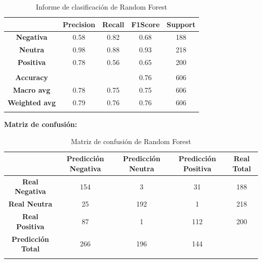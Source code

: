 \documentclass{report}
\begin{document}
{\begin{center}
{                    \begin{longtable}{|c|c|c|c|c|}
                    \hline
                    & \textbf{Precision} & \textbf{Recall} & \textbf{F1Score} & \textbf{Support} \\
                    \hline
                    \textbf{Negativa} & 0.58 & 0.82 & 0.68 & 188 \\
                    \hline
                    \textbf{Neutra} & 0.98 & 0.88 & 0.93 & 218 \\
                    \hline
                    \textbf{Positiva} & 0.78 & 0.56 & 0.65 & 200 \\
                    \hline
                    & \phantom{} & \phantom{} & \phantom{} & \phantom{} \\
                    \hline
                    \textbf{Accuracy} &  &  & 0.76 & 606 \\
                    \hline
                    \textbf{Macro avg} & 0.78 & 0.75 & 0.75 & 606 \\
                    \hline
                    \textbf{Weighted avg} & 0.79 & 0.76 & 0.76 & 606 \\
                    \hline
                    \caption{Informe de clasificación de Random Forest}
                    \end{longtable}
            
                    \textbf{Matriz de confusión: }


                    \begin{longtable}{|c|c|c|c|c|}
                    \hline
                     & \textbf{Predicción Negativa} & \textbf{Predicción Neutra} & \textbf{Predicción Positiva} & \textbf{Real Total} \\ \hline
                    \endhead
                    \textbf{Real Negativa} & 154 & 3 & 31 & 188\\ \hline
                    \textbf{Real Neutra} & 25 & 192 & 1 & 218\\ \hline
                    \textbf{Real Positiva} & 87 & 1 & 112 & 200\\ \hline
                    \textbf{Predicción Total} & 266 & 196 & 144  & \\
                    \hline
                    \caption{Matriz de confusión de Random Forest}
                    \end{longtable}}
                    \end{center}
}
\end{document}
